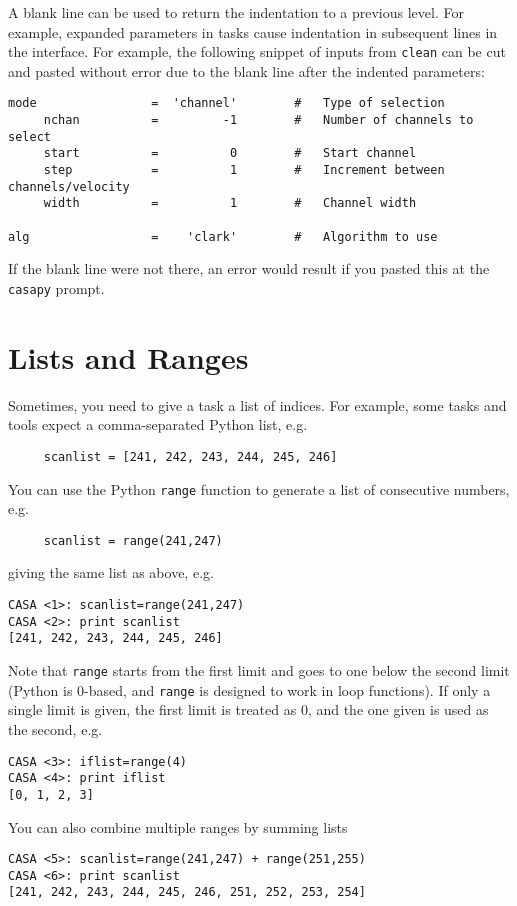 A blank line can be used to return the indentation to a previous
level.  For example, expanded parameters in tasks cause indentation
in subsequent lines in the interface.  For example, the following
snippet of inputs from {\tt clean} can be cut and pasted without 
error due to the blank line after the indented parameters:
\small
\begin{verbatim}
mode                =  'channel'        #   Type of selection
     nchan          =         -1        #   Number of channels to select 
     start          =          0        #   Start channel
     step           =          1        #   Increment between channels/velocity
     width          =          1        #   Channel width

alg                 =    'clark'        #   Algorithm to use
\end{verbatim}
\normalsize
If the blank line were not there, an error would result if you pasted
this at the {\tt casapy} prompt.

\section{Lists and Ranges}
\label{section:python.lists}

Sometimes, you need to give a task a list of indices.  For example,
some tasks and tools expect a comma-separated Python list, e.g.
\small
\begin{verbatim}
     scanlist = [241, 242, 243, 244, 245, 246]
\end{verbatim}
\normalsize
You can use the Python {\tt range} function to generate a list of
consecutive numbers, e.g.
\small
\begin{verbatim}
     scanlist = range(241,247)
\end{verbatim}
\normalsize
giving the same list as above, e.g.
\small
\begin{verbatim}
CASA <1>: scanlist=range(241,247)
CASA <2>: print scanlist
[241, 242, 243, 244, 245, 246]
\end{verbatim}
\normalsize
Note that {\tt range} starts from the first limit and goes to
one below the second limit (Python is 0-based, and {\tt range}
is designed to work in loop functions).  If only a single limit
is given, the first limit is treated as 0, and the one given is
used as the second, e.g.
\small
\begin{verbatim}
CASA <3>: iflist=range(4)
CASA <4>: print iflist
[0, 1, 2, 3]
\end{verbatim}
\normalsize
You can also combine multiple ranges by summing lists
\small
\begin{verbatim}
CASA <5>: scanlist=range(241,247) + range(251,255)
CASA <6>: print scanlist
[241, 242, 243, 244, 245, 246, 251, 252, 253, 254]
\end{verbatim}
\normalsize

